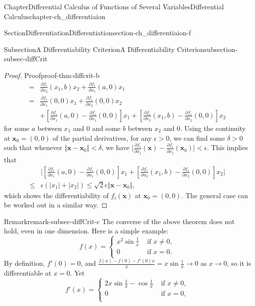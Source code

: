\documentclass[oneside,10pt,]{book}
\numberwithin{equation}{section}
\newcommand{\bx}{\mathbf{x}}
\newcommand{\lt}{<}
\newcommand{\gt}{>}
\newcommand{\amp}{&}
\begin{document}
\begin{chapterptx}{Chapter}{Differential Calculus of Functions of Several Variables}{}{Differential Calculus}{}{}{chapter-ch_differentiaion}
\begin{sectionptx}{Section}{Differentiation}{}{Differentiation}{}{}{section-ch_differentiaion-f}
\begin{subsectionptx}{Subsection}{A Differentiability Criterion}{}{A Differentiability Criterion}{}{}{subsection-subsec-diffCrit}
\begin{proof}{Proof}{}{proof-thm-diffcrit-b}
\begin{align*}
= \amp \frac{\partial f_i}{\partial x_2}(x_1, b)x_2+ \frac{\partial f_i}{\partial x_1}(a, 0)x_1\\
= \amp \frac{\partial f_i}{\partial x_1}(0, 0) x_1 + \frac{\partial f_i}{\partial x_2}(0, 0)x_2\\
\amp + \left[ \frac{\partial f_i}{\partial x_1}(a, 0)-\frac{\partial f_i}{\partial x_1}(0, 0)\right] x_1+
\left[ \frac{\partial f_i}{\partial x_2}(x_1, b)- \frac{\partial f_i}{\partial x_2}(0, 0)\right] x_2
\end{align*}
for some \(a\) between \(x_1\) and \(0\) and some \(b\) between \(x_2\) and \(0\). Using the continuity at \(\bx_0=(0, 0)\) of the partial derivatives, for any \(\epsilon \gt 0\), we can find some \(\delta \gt 0\) such that whenever \(\Vert \bx -\bx_0\Vert \lt \delta\), we have \(\vert \frac{\partial f_i}{\partial x_j}(\bx)- \frac{\partial f_i}{\partial x_j}(\bx_0)\vert \lt \epsilon\). This implies that%
\begin{align*}
\amp \vert \left[ \frac{\partial f_i}{\partial x_1}(a, 0)-\frac{\partial f_i}{\partial x_1}(0, 0)\right] x_1+
\left[ \frac{\partial f_i}{\partial x_2}(x_1, b)- \frac{\partial f_i}{\partial x_2}(0, 0)\right] x_2\vert \\
\le \amp \epsilon \left(|x_1|+|x_2|\right)\le \sqrt 2 \epsilon \Vert \bx-\bx_0\Vert,
\end{align*}
which shows the differentiability of \(f_i(\bx)\) at \(\bx_0=(0, 0)\). The general case can be worked out in a similar way.%
\end{proof}
\begin{remark}{Remark}{}{remark-subsec-diffCrit-c}%
The converse of the above theorem does not hold, even in one dimension. Here is a simple example:%
\begin{equation*}
f(x)=\begin{cases} x^{2}\sin\frac 1x \amp\text{ if } x\ne 0, \\
0 \amp\text{ if } x=0.\\
\end{cases}
\end{equation*}
By definition, \(f'(0)=0\), and \(\frac{f(x)-f(0)-f'(0)x}{x}=x\sin\frac 1x \to 0\) as  \(x\to 0 \), so it is differentiable at \(x=0\). Yet%
\begin{equation*}
f'(x)=\begin{cases}2 x \sin\frac 1x- \cos \frac 1x \amp\text{ if } x\ne 0, \\
0 \amp\text{ if } x=0,\\
\end{cases}

\end{equation*}
\end{remark}
\end{subsectionptx}
\end{sectionptx}
\end{chapterptx}
\end{document}

